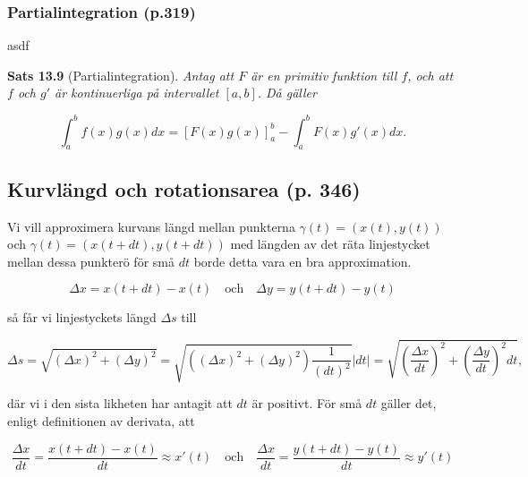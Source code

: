 \documentclass[11pt]{article}
\begin{document}
\subsubsection{Partialintegration (p.319)}
asdf

\textbf{Sats 13.9} (Partialintegration). \textit{Antag att $F$ är en primitiv funktion till $f$, och att $f$ och $g'$ är kontinuerliga på intervallet $[a, b]$. Då gäller}

\begin{equation}
    \int_a^b{f(x)g(x)}dx = \left [F(x)g(x)\right ]_a^b - \int_a^b{F(x)g'(x)}dx.
\end{equation}

\subsection{Kurvlängd och rotationsarea (p. 346)}


Vi vill approximera kurvans längd mellan punkterna $\gamma(t) = (x(t), y(t))$ och $\gamma(t) = (x(t + dt), y(t + dt))$ med längden av det räta linjestycket mellan dessa punkterö för små $dt$ borde detta vara en bra approximation.

\begin{equation}
    \Delta x = x(t + dt) - x(t)\quad \mathrm{och}\quad \Delta y = y(t + dt) - y(t)
    \label{eq:kurvlangd_def}
\end{equation}

så får vi linjestyckets längd $\Delta s$ till

\begin{equation}
    \Delta s = \sqrt{(\Delta x)^2 + (\Delta y)^2} = \sqrt{\left((\Delta x)^2 + (\Delta y)^2\right)\frac{1}{(dt)^2}}|dt| = \sqrt{\left(\frac{\Delta x}{dt}\right)^2 + \left(\frac{\Delta y}{dt}\right)^2 dt},
    \label{eq:kurvlangd_linje}
\end{equation}

där vi i den sista likheten har antagit att $dt$ är positivt. För små $dt$ gäller det, enligt definitionen av derivata, att

\begin{equation}
    \frac{\Delta x}{dt} = \frac{x(t + dt) - x(t)}{dt} \approx x'(t)\quad \mathrm{och}\quad \frac{\Delta x}{dt} = \frac{y(t + dt) - y(t)}{dt} \approx y'(t)
    \label{eq:kurvlangd_def_deri}
\end{equation}
\end{document}
